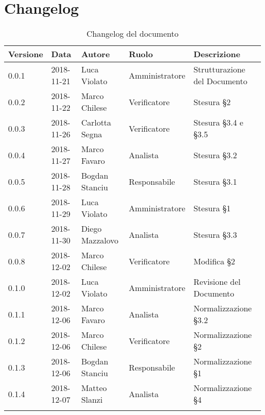 \section{Changelog}

\begin{center}
\begin{longtable}[c]{|m{}|m{}|m{}|m{}|p{}|}
\hline
\textbf{Versione} & \textbf{Data} & \textbf{Autore} & \textbf{Ruolo} & \textbf{Descrizione} \\
\hline \hline
\endfirsthead
0.0.1 & 2018-11-21 & Luca Violato & Amministratore & Strutturazione del Documento \\
\hline
0.0.2 & 2018-11-22 & Marco Chilese & Verificatore & Stesura §2 \\
\hline
0.0.3 & 2018-11-26 & Carlotta Segna & Verificatore & Stesura §3.4 e §3.5 \\
\hline
0.0.4 & 2018-11-27 & Marco Favaro & Analista & Stesura §3.2 \\
\hline
0.0.5 & 2018-11-28 & Bogdan Stanciu & Responsabile & Stesura §3.1\\
\hline
0.0.6 & 2018-11-29 & Luca Violato & Amministratore & Stesura §1 \\
\hline
0.0.7 & 2018-11-30 & Diego Mazzalovo & Analista & Stesura §3.3 \\
\hline
0.0.8 & 2018-12-02 & Marco Chilese & Verificatore & Modifica §2 \\
\hline
0.1.0 & 2018-12-02 & Luca Violato & Amministratore & Revisione del Documento\\
\hline
0.1.1 & 2018-12-06 & Marco Favaro & Analista & Normalizzazione §3.2\\
\hline
0.1.2 & 2018-12-06 & Marco Chilese & Verificatore & Normalizzazione §2\\
\hline
0.1.3 & 2018-12-06 & Bogdan Stanciu & Responsabile & Normalizzazione §1\\
\hline
0.1.4 & 2018-12-07 & Matteo Slanzi & Analista & Normalizzazione §4\\
\hline
\caption{Changelog del documento}
\end{longtable}
\end{center}

